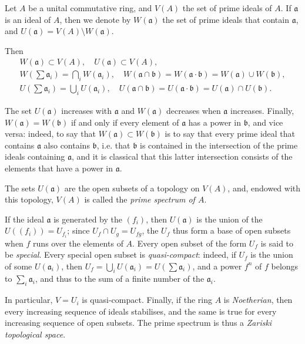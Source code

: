 \documentclass{article}
\theoremstyle{plain}
\theoremstyle{definition}
\newcommand{\oldpage}[1]{\marginpar{\footnotesize$\Big\vert$ \textit{p.~#1}}}
\begin{document}
Let $A$ be a unital commutative ring, and $V(A)$ the set of prime ideals of $A$.
If $\mathfrak{a}$ is an ideal of $A$, then we denote by $W(\mathfrak{a})$ the set of prime ideals that contain $\mathfrak{a}$, and $U(\mathfrak{a})=V(A)\setminus W(\mathfrak{a})$.

Then
\begin{gather*}
  W(\mathfrak{a}) \subset V(A), \quad U(\mathfrak{a})\subset V(A),
\\W(\sum\mathfrak{a}_i) = \bigcap_i W(\mathfrak{a}_i),
\quad W(\mathfrak{a}\cap\mathfrak{b}) = W(\mathfrak{a}\cdot\mathfrak{b}) = W(\mathfrak{a})\cup W(\mathfrak{b}),
\\U(\sum\mathfrak{a}_i) = \bigcup_i U(\mathfrak{a}_i),
\quad U(\mathfrak{a}\cap\mathfrak{b}) = U(\mathfrak{a}\cdot\mathfrak{b}) = U(\mathfrak{a})\cap U(\mathfrak{b}).
\end{gather*}

The set $U(\mathfrak{a})$ increases with $\mathfrak{a}$ and $W(\mathfrak{a})$ decreases when $\mathfrak{a}$ increases.
Finally, $W(\mathfrak{a})=W(\mathfrak{b})$ if and only if every element of $\mathfrak{a}$ has a power in $\mathfrak{b}$, and vice versa:
indeed, to say that $W(\mathfrak{a})\subset W(\mathfrak{b})$ is to say that every prime ideal that contains $\mathfrak{a}$ also contains $\mathfrak{b}$, i.e. that $\mathfrak{b}$ is contained in the intersection of the prime ideals containing $\mathfrak{a}$, and it is classical that this latter intersection consists of the elements that have a power in $\mathfrak{a}$.

The sets $U(\mathfrak{a})$ are the open subsets of a topology on $V(A)$, and, endowed with this topology, $V(A)$ is called the \emph{prime spectrum of $A$}.

If the ideal $\mathfrak{a}$ is generated by the $(f_i)$, then $U(\mathfrak{a})$ is the union of the $U((f_i))=U_{f_i}$;
since $U_f\cap U_g=U_{fg}$, the $U_f$ thus form a base of open subsets when $f$ runs over the elements of $A$.
Every open subset of the form $U_f$ is said to be \emph{special}.
Every special open subset is \emph{quasi-compact}:
indeed, if $U_f$ is the union of some $U(\mathfrak{a}_i)$, then $U_f=\bigcup_i U(\mathfrak{a}_i)=U(\sum\mathfrak{a}_i)$, and a power $f^n$ of $f$ belongs to $\sum_i\mathfrak{a}_i$, and thus to the sum of a finite number of the $\mathfrak{a}_i$.

In particular, $V=U_i$ is quasi-compact.
Finally, if the ring $A$ is \emph{Noetherian}, then every increasing sequence of ideals stabilises, and the same is true for every
\oldpage{1-04}
increasing sequence of open subsets.
The prime spectrum is thus a \emph{Zariski topological space}.
\end{document}
